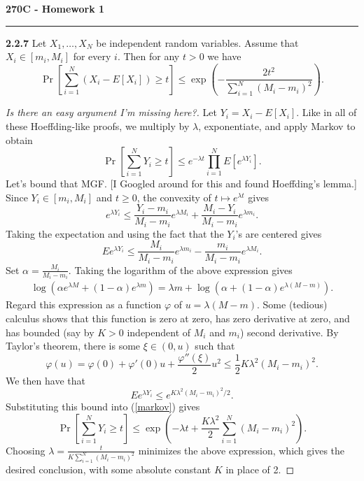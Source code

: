 \documentclass[11pt,letterpaper]{report}
\begin{document}
\begin{center}
{\bf \Large 270C - Homework 1}
\vspace{0.2cm}
\hrule
\end{center}

\noindent\textbf{2.2.7}
Let $X_1, \ldots, X_N$ be independent random variables. Assume that $X_i\in [m_i, M_i]$ for every $i$. Then for any $t>0$ we have
\[
\Pr\left[\sum_{i=1}^N(X_i- E[X_i])\geq t \right] \leq \exp\left(-\frac{2t^2}{\sum_{i=1}^N(M_i-m_i)^2} \right).
\]
\begin{proof}
	[Is there an easy argument I'm missing here?] Let $Y_i = X_i - E[X_i]$. Like in all of these Hoeffding-like proofs, we multiply by $\lambda$, exponentiate, and apply Markov to obtain
	\begin{equation}\label{markov}
	\Pr\left[\sum_{i=1}^NY_i \geq t\right]  \leq e^{-\lambda t}\prod_{i=1}^NE\left[e^{\lambda Y_i} \right].
	\end{equation}
	Let's bound that MGF. [I Googled around for this and found Hoeffding's lemma.] Since $Y_i \in [m_i, M_i]$ and $t\geq 0$, the convexity of $t\mapsto e^{\lambda t}$ gives
	\[
	e^{\lambda Y_i}\leq \frac{Y_i-m_i}{M_i-m_i}e^{\lambda M_i} + \frac{M_i-Y_i}{M_i-m_i}e^{\lambda m_i}.
	\]
	Taking the expectation and using the fact that the $Y_i$'s are centered gives
	\[
	Ee^{\lambda Y_i}\leq \frac{M_i}{M_i-m_i}e^{\lambda m_i} - \frac{m_i}{M_i-m_i}e^{\lambda M_i}.
	\]
	Set $\alpha = \frac{M_i}{M_i - m_i}$. Taking the logarithm of the above expression gives
	\begin{align*}
		\log(\alpha e^{\lambda M} + (1-\alpha)e^{\lambda m}) = \lambda m + \log(\alpha + (1-\alpha)e^{\lambda(M-m)}).
	\end{align*}
	Regard this expression as a function $\varphi$ of $u = \lambda(M-m)$. Some (tedious) calculus shows that this function is zero at zero, has zero derivative at zero, and has bounded (say by $K>0$ independent of $M_i$ and $m_i$) second derivative. By Taylor's theorem, there is some $\xi\in (0, u)$ such that
	\[
	\varphi(u) = \varphi(0) + \varphi'(0)u + \frac{\varphi''(\xi)}{2}u^2 \leq \frac{1}{2}K\lambda^2(M_i-m_i)^2.
	\]
	We then have that
	\[
	Ee^{\lambda Y_i}\leq e^{K\lambda^2(M_i-m_i)^2/2}.
	\]
	Substituting this bound into (\ref{markov}) gives
	\[
	\Pr\left[\sum_{i=1}^NY_i \geq t\right]  \leq \exp\left(-\lambda t + \frac{K\lambda^2}{2}\sum_{i=1}^N(M_i-m_i)^2 \right).
	\]
	Choosing $\lambda= \frac{t}{K\sum_{i=1}^N(M_i-m_i)^2}$ minimizes the above expression, which gives the desired conclusion, with some absolute constant $K$ in place of 2. 

\end{proof}
\end{document}

